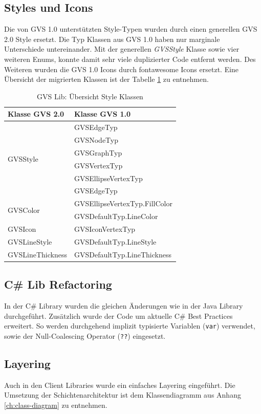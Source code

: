 \documentclass[11pt,a4paper,english,oneside]{book}
\numberwithin{equation}{chapter}
\begin{document}
	\subsection{Styles und Icons}
	Die von GVS 1.0 unterstützten Style-Typen wurden durch einen generellen GVS 2.0 Style ersetzt. Die Typ Klassen aus GVS 1.0 haben nur marginale Unterschiede untereinander. Mit der generellen \textit{GVSStyle} Klasse sowie vier weiteren Enums, konnte damit sehr viele duplizierter Code entfernt werden. Des Weiteren wurden die GVS 1.0 Icons durch \gls{fontawesome} Icons ersetzt. Eine Übersicht der migrierten Klassen ist der Tabelle \ref{tbl:styles} zu entnehmen.
	
	\begin{table}[h!]
		\centering
		\begin{tabularx}{\linewidth}{X X}
			\toprule 
			Klasse GVS 2.0 & Klasse GVS 1.0\\
			\midrule
			\multirow{6}{*}{GVSStyle} & 
			GVSEdgeTyp \\ & 
			GVSNodeTyp \\ & 
			GVSGraphTyp  \\ &
			GVSVertexTyp  \\ &
			GVSEllipseVertexTyp \\ &
			GVSEdgeTyp \\
			\midrule
			\multirow{2}{*}{GVSColor} & GVSEllipseVertexTyp.FillColor \\ &
			GVSDefaultTyp.LineColor \\
			\midrule
			GVSIcon & GVSIconVertexTyp \\
			\midrule
			GVSLineStyle & GVSDefaultTyp.LineStyle \\
			\midrule
			GVSLineThickness & GVSDefaultTyp.LineThickness \\
			\bottomrule 
		\end{tabularx} 
		\caption{GVS Lib: Übersicht Style Klassen} 
		\label{tbl:styles}
	\end{table}
	
	\subsection{C\# Lib Refactoring}
	In der C\# Library wurden die gleichen Änderungen wie in der Java Library durchgeführt. Zusätzlich wurde der Code um aktuelle C\# Best Practices erweitert. So werden durchgehend implizit typisierte Variablen (\lstinline|var|) verwendet, sowie der Null-Coalescing Operator (\lstinline|??|) eingesetzt. 
	
	\subsection{Layering}
	Auch in den Client Libraries wurde ein einfaches Layering eingeführt. Die Umsetzung der Schichtenarchitektur ist dem Klassendiagramm aus Anhang \ref{ch:class-diagram} zu entnehmen.	
\end{document}
